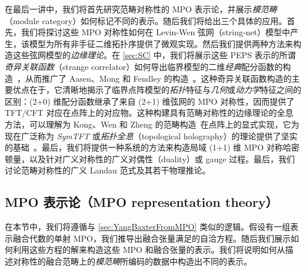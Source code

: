 在最后一讲中，我们将首先研究范畴对称性的 MPO 表示论，并展示\emph{模范畴}（module category）如何标记不同的表示。随后我们将给出三个具体的应用。首先，我们将探讨这些 MPO 对称性如何在 Levin-Wen 弦网（string-net）模型中产生，该模型为所有非手征二维拓扑序提供了微观实现。然后我们提供两种方法来构造这些弦网模型的\emph{边缘理论}。在 \cref{sec:SC} 中，我们将展示这些 PEPS 表示的所谓\emph{奇异关联函数}（strange correlator）如何导出临界模型的二维\emph{经典}配分函数的构造~\cite{Vanhove2018}，从而推广了 Aasen、Mong 和 Fendley 的构造~\cite{Aasen2016}。这种奇异关联函数构造的主要优点在于，它清晰地揭示了临界点阵模型的\emph{拓扑}特征与\emph{几何}或\emph{动力学}特征之间的区别：(2+0) 维配分函数继承了来自 (2+1) 维弦网的 MPO 对称性，因而提供了 TFT/CFT 对应在点阵上的对应物。这种构建具有范畴对称性的边缘理论的全息方法，可以理解为 Kong、Wen 和 Zheng 的范畴构造~\cite{Kong2015}在点阵上的显式实现，它为现在广泛称为 \emph{SymTFT} 或\emph{拓扑全息}（topological holography）的理论提供了坚实的基础~\cite{Apruzzi2021,Chatterjee2022,Freed2022,Delcamp2024,Chen2025}。最后，我们将提供一种系统的方法来构造局域 (1+1) 维 MPO 对称哈密顿量，以及针对广义对称性的广义对偶性（duality）或 gauge 过程。最后，我们讨论范畴对称性的广义 Landau 范式及其若干物理推论。

\subsection{MPO 表示论（MPO representation theory）}\label{sec:MPORepresentationTheory}
在本节中，我们将遵循与 \cref{sec:YangBaxterFromMPO} 类似的逻辑。假设有一组表示融合代数的单射 MPO，我们推导出融合张量满足的自洽方程。随后我们展示如何利用这些方程的解来构造这些 MPO 和融合张量的表示。我们将说明如何从描述对称性的融合范畴上的\emph{模范畴}所编码的数据中构造出不同的表示。

